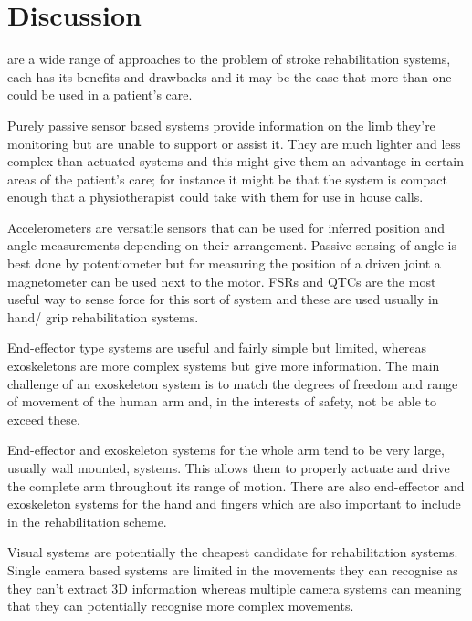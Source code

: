 \documentclass[journal]{IEEEtran}
\begin{document}

\section{Discussion}
 are a wide range of approaches to the problem of stroke rehabilitation systems, 
each has its benefits and drawbacks and it may be the case that more than one 
could be used in a patient's care.

Purely passive sensor based systems provide information on the limb they're 
monitoring but are unable to support or assist it. They are much lighter 
and less complex than actuated systems and this might give them an advantage 
in certain areas of the patient's care; for instance it might be that the 
system is compact enough that  a physiotherapist could take with them for use in house calls.

Accelerometers are versatile sensors that can be used for inferred position and angle 
measurements depending on their arrangement. Passive sensing of angle is best done by 
potentiometer but for measuring the position of a driven joint a magnetometer can 
be used next to the motor. FSRs and QTCs are the most useful way to sense force for 
this sort of system and these are used usually in hand/ grip rehabilitation systems.

End-effector type systems are useful and fairly simple but limited, whereas 
exoskeletons are more complex systems but give more information. The main 
challenge of an exoskeleton system is to match the degrees of freedom and 
range of movement of the human arm and, in the interests of safety, not be 
able to exceed these.

End-effector and exoskeleton systems for the whole arm tend to be very large, 
usually wall mounted, systems. This allows them to properly actuate and drive the 
complete arm throughout its range of motion. There are also end-effector and 
exoskeleton systems for the hand and fingers which are also important to 
include in the rehabilitation scheme.

Visual systems are potentially the cheapest candidate for rehabilitation systems. 
Single camera based systems are limited in the movements they can recognise as 
they can't extract 3D information whereas multiple camera systems can meaning 
that they can potentially recognise more complex movements.
\end{document}
